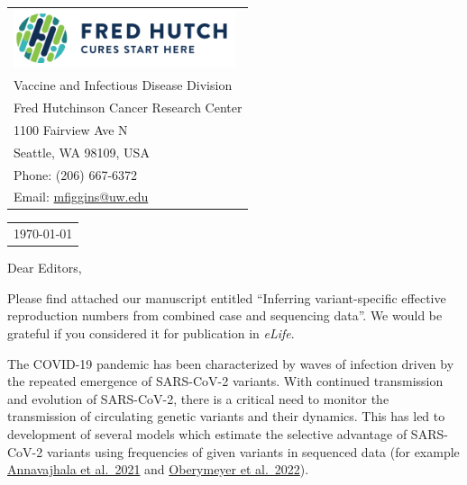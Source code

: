 \documentclass[11pt]{article}
\begin{document}
\thispagestyle{empty} %

\mbox{}\hfill
\begin{tabular}{l @{}}
	\includegraphics[width=6.5cm]{figures/fhcrc_logo} \\
	Vaccine and Infectious Disease Division \\
	Fred Hutchinson Cancer Research Center \\
	1100 Fairview Ave N \\
	Seattle, WA 98109, USA \\
	Phone: (206) 667-6372 \\
	Email: \href{mailto:mfiggins@uw.edu}{mfiggins@uw.edu} \\
\end{tabular}

\vspace{0.1in} %

\begin{tabular}{@{} l}
  \today
\end{tabular}

\vspace{0.1in} %

Dear Editors,

\medskip %

Please find attached our manuscript entitled ``Inferring variant-specific effective reproduction numbers from combined case and sequencing data''.
We would be grateful if you considered it for publication in \textit{eLife}.

The COVID-19 pandemic has been characterized by waves of infection driven by the repeated emergence of SARS-CoV-2 variants.
With continued transmission and evolution of SARS-CoV-2, there is a critical need to monitor the transmission of circulating genetic variants and their dynamics.
This has led to development of several models which estimate the selective advantage of SARS-CoV-2 variants using frequencies of given variants in sequenced data (for example \href{https://www.nature.com/articles/s41586-021-03908-2}{Annavajhala et al.\ 2021} and \href{https://www.science.org/doi/10.1126/science.abm1208}{Oberymeyer et al.\ 2022}).
\end{document}
